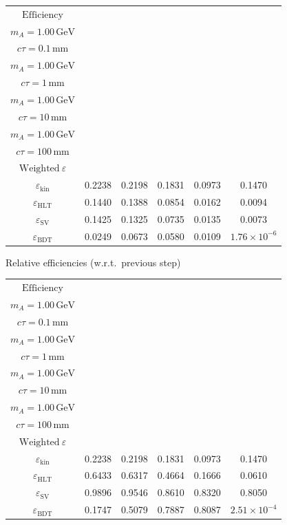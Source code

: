 \documentclass[10pt,a4paper]{article}
\begin{document}
{\begin{tabular}{cccccc}
\toprule
$\mathrm{Efficiency}$ & \shortstack{$m_{\pi}=10\,\mathrm{GeV}$\\$m_{A}=1.00\,\mathrm{GeV}$\\$c\tau=0.1\,\mathrm{mm}$} & \shortstack{$m_{\pi}=10\,\mathrm{GeV}$\\$m_{A}=1.00\,\mathrm{GeV}$\\$c\tau=1\,\mathrm{mm}$} & \shortstack{$m_{\pi}=10\,\mathrm{GeV}$\\$m_{A}=1.00\,\mathrm{GeV}$\\$c\tau=10\,\mathrm{mm}$} & \shortstack{$m_{\pi}=10\,\mathrm{GeV}$\\$m_{A}=1.00\,\mathrm{GeV}$\\$c\tau=100\,\mathrm{mm}$} & \shortstack{$\mathrm{QCD}$\\$\mathrm{Weighted}\ \varepsilon$} \\
\midrule
$\varepsilon_{\mathrm{kin}}$ & 0.2238 & 0.2198 & 0.1831 & 0.0973 & 0.1470\\
$\varepsilon_{\mathrm{HLT}}$ & 0.1440 & 0.1388 & 0.0854 & 0.0162 & 0.0094\\
$\varepsilon_{\mathrm{SV}}$ & 0.1425 & 0.1325 & 0.0735 & 0.0135 & 0.0073\\
$\varepsilon_{\mathrm{BDT}}$ & 0.0249 & 0.0673 & 0.0580 & 0.0109 & $1.76\times10^{-6}$\\
\bottomrule
\end{tabular}

\vspace{18pt}

Relative efficiencies (w.r.t.\ previous step)

\begin{tabular}{cccccc}
\toprule
$\mathrm{Efficiency}$ & \shortstack{$m_{\pi}=10\,\mathrm{GeV}$\\$m_{A}=1.00\,\mathrm{GeV}$\\$c\tau=0.1\,\mathrm{mm}$} & \shortstack{$m_{\pi}=10\,\mathrm{GeV}$\\$m_{A}=1.00\,\mathrm{GeV}$\\$c\tau=1\,\mathrm{mm}$} & \shortstack{$m_{\pi}=10\,\mathrm{GeV}$\\$m_{A}=1.00\,\mathrm{GeV}$\\$c\tau=10\,\mathrm{mm}$} & \shortstack{$m_{\pi}=10\,\mathrm{GeV}$\\$m_{A}=1.00\,\mathrm{GeV}$\\$c\tau=100\,\mathrm{mm}$} & \shortstack{$\mathrm{QCD}$\\$\mathrm{Weighted}\ \varepsilon$} \\
\midrule
$\varepsilon_{\mathrm{kin}}$ & 0.2238 & 0.2198 & 0.1831 & 0.0973 & 0.1470\\
$\varepsilon_{\mathrm{HLT}}$ & 0.6433 & 0.6317 & 0.4664 & 0.1666 & 0.0610\\
$\varepsilon_{\mathrm{SV}}$ & 0.9896 & 0.9546 & 0.8610 & 0.8320 & 0.8050\\
$\varepsilon_{\mathrm{BDT}}$ & 0.1747 & 0.5079 & 0.7887 & 0.8087 & $2.51\times10^{-4}$\\
\bottomrule
\end{tabular}

}
\end{document}
